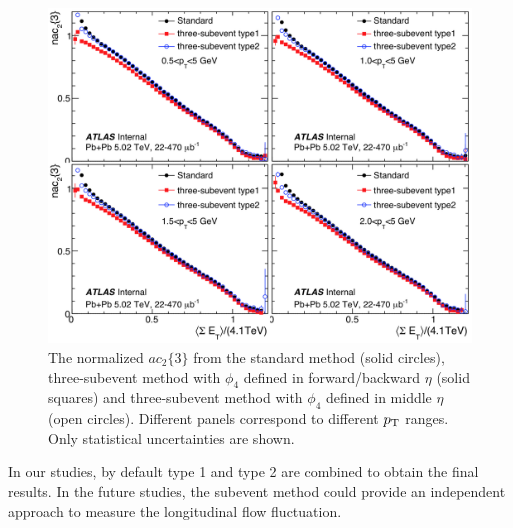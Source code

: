 \begin{figure}[H]
\centering
\includegraphics[width=.95\linewidth]{figs/chapter_subcumu/ATLAS_nac24_PbPb_decorr.png}
\caption{The normalized $ac_2\{3\}$ from the standard method (solid circles), three-subevent method with $\phi_4$ defined in forward/backward $\eta$ (solid squares) and three-subevent method with $\phi_4$ defined in middle $\eta$ (open circles). Different panels correspond to different $p_\text{T}$ ranges. Only statistical uncertainties are shown.}
\label{fig:ATLAS_nac24_PbPb_decorr}
\end{figure}

In our studies, by default type 1 and type 2 are combined to obtain the final results. In the future studies, the subevent method could provide an independent approach to measure the longitudinal flow fluctuation.










